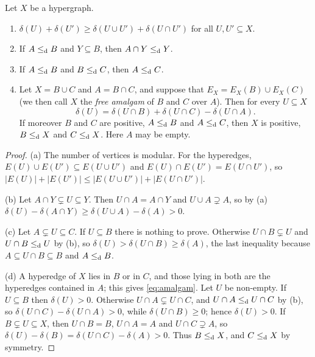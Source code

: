 \begin{lemma}\label{lem:calc}
Let $X$ be a hypergraph.
\begin{enumerate}
\item[\textup{(a)}] $\delta(U)+\delta(U')\ge\delta(U\cup U')+\delta(U\cap U')$ for all
 $U,U'\subseteq X$.
\item[\textup{(b)}] If $A\leq_{\mathrm{d}} B$ and $Y\subseteq B$, then $A\cap Y\leq_{\mathrm{d}} Y$.
\item[\textup{(c)}] If $A\leq_{\mathrm{d}} B$ and $B\leq_{\mathrm{d}} C$, then $A\leq_{\mathrm{d}} C$.
\item[\textup{(d)}] Let $X=B\cup C$ and $A=B\cap C$, and suppose that
 $E_X=E_X(B)\cup E_X(C)$ \textup{(}we then call $X$ the \emph{free amalgam} of $B$
 and $C$ over $A$\textup{)}. Then for every $U\subseteq X$
 \begin{equation}\label{eq:amalgam}
  \delta(U)=\delta(U\cap B)+\delta(U\cap C)-\delta(U\cap A).
 \end{equation}
 If moreover $B$ and $C$ are positive, $A\leq_{\mathrm{d}} B$ and $A\leq_{\mathrm{d}} C$, then $X$ is
 positive, $B\leq_{\mathrm{d}} X$ and $C\leq_{\mathrm{d}} X$. Here $A$ may be empty.
\end{enumerate}
\end{lemma}

\begin{proof}
(a) The number of vertices is modular. For the hyperedges,
$E(U)\cup E(U')\subseteq E(U\cup U')$ and $E(U)\cap E(U')=E(U\cap U')$, so
$|E(U)|+|E(U')|\le|E(U\cup U')|+|E(U\cap U')|$.

(b) Let $A\cap Y\subsetneq U\subseteq Y$. Then $U\cap A=A\cap Y$ and
$U\cup A\supsetneq A$, so by (a)
$\delta(U)-\delta(A\cap Y)\ge\delta(U\cup A)-\delta(A)>0$.

(c) Let $A\subsetneq U\subseteq C$. If $U\subseteq B$ there is nothing to prove.
Otherwise $U\cap B\subsetneq U$ and $U\cap B\leq_{\mathrm{d}} U$ by (b), so
$\delta(U)>\delta(U\cap B)\ge\delta(A)$, the last inequality because
$A\subseteq U\cap B\subseteq B$ and $A\leq_{\mathrm{d}} B$.

(d) A hyperedge of $X$ lies in $B$ or in $C$, and those lying in both are the
hyperedges contained in $A$; this gives \eqref{eq:amalgam}. Let $U$ be
non-empty. If $U\subseteq B$ then $\delta(U)>0$. Otherwise
$U\cap A\subsetneq U\cap C$, and $U\cap A\leq_{\mathrm{d}} U\cap C$ by (b), so
$\delta(U\cap C)-\delta(U\cap A)>0$, while $\delta(U\cap B)\ge 0$; hence
$\delta(U)>0$. If $B\subsetneq U\subseteq X$, then $U\cap B=B$, $U\cap A=A$ and
$U\cap C\supsetneq A$, so
$\delta(U)-\delta(B)=\delta(U\cap C)-\delta(A)>0$. Thus $B\leq_{\mathrm{d}} X$, and
$C\leq_{\mathrm{d}} X$ by symmetry.
\end{proof}

